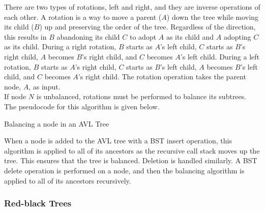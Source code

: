 There are two types of rotations, left and right, and they are inverse operations of each other. A rotation is a way to move a parent ($A$) down the tree while moving its child ($B$) up and preserving the order of the tree. Regardless of the direction, this results in $B$ abandoning its child $C$ to adopt $A$ as its child and $A$ adopting $C$ as its child. During a right rotation, $B$ starts as $A$'s left child, $C$ starts as $B$'s right child, $A$ becomes $B$'s right child, and $C$ becomes $A$'s left child. During a left rotation, $B$ starts as $A$'s right child, $C$ starts as $B$'s left child, $A$ becomes $B$'s left child, and $C$ becomes $A$'s right child. The rotation operation takes the parent node, $A$, as input. \\

If node $N$ is unbalanced, rotations must be performed to balance its subtrees. The pseudocode for this algorithm is given below. \\

\begin{algorithm}[H]
    \caption{Balancing a node in an AVL Tree}
\end{algorithm}
\vspace{5mm}

When a node is added to the AVL tree with a BST insert operation, this algorithm is applied to all of its ancestors as the recursive call stack moves up the tree. This ensures that the tree is balanced. Deletion is handled similarly. A BST delete operation is performed on a node, and then the balancing algorithm is applied to all of its ancestors recursively. \\

\subsubsection{Red-black Trees}

